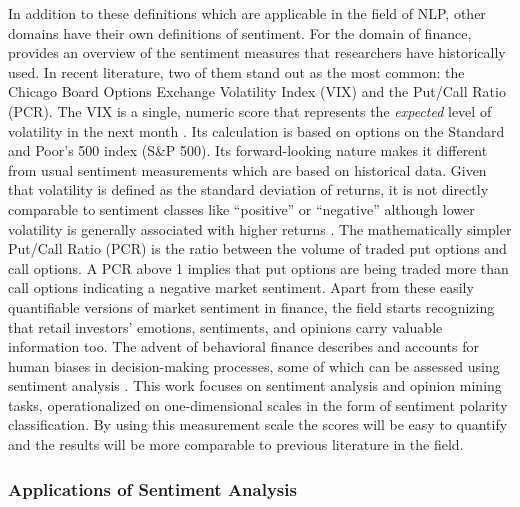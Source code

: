 In addition to these definitions which are applicable in the field of NLP, other domains have their own definitions of sentiment. For the domain of finance,  provides an overview of the sentiment measures that researchers have historically used. In recent literature, two of them stand out as the most common: the Chicago Board Options Exchange Volatility Index (VIX) and the Put/Call Ratio (PCR). The VIX is a single, numeric score that represents the \emph{expected} level of volatility in the next month . Its calculation is based on options on the Standard and Poor's 500 index (S\&P 500). Its forward-looking nature makes it different from usual sentiment measurements which are based on historical data. Given that volatility is defined as the standard deviation of returns, it is not directly comparable to sentiment classes like ``positive'' or ``negative'' although lower volatility is generally associated with higher returns . The mathematically simpler Put/Call Ratio (PCR) is the ratio between the volume of traded put options and call options. A PCR above 1 implies that put options are being traded more than call options indicating a negative market sentiment. Apart from these easily quantifiable versions of market sentiment in finance, the field starts recognizing that retail investors' emotions, sentiments, and opinions carry valuable information too. The advent of behavioral finance describes and accounts for human biases in decision-making processes, some of which can be assessed using sentiment analysis .\newline 
This work focuses on sentiment analysis and opinion mining tasks, operationalized on one-dimensional scales in the form of sentiment polarity classification. By using this measurement scale the scores will be easy to quantify and the results will be more comparable to previous literature in the field.


\subsubsection{Applications of Sentiment Analysis}

